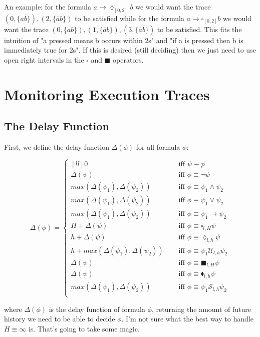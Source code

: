\documentclass[10pt,a4paper]{article}
\newcommand{\ov}[1]{\ensuremath{\overline{#1}}}
\begin{document}
An example: for the formula $a \rightarrow \lozenge_{[0,2]} b$ we would want the trace $(0,\{a\ov{b}\}),(2,\{\ov{a}b\})$ to be satisfied while for the formula $a \rightarrow \square_{[0,2]}b$ we would want the trace $(0,\{ab\}),(1,\{\ov{a}b\}),(3,\{\ov{a}\ov{b}\})$ to be satisfied. This fits the intuition of "a pressed means b occurs within 2s" and "if a is pressed then b is immediately true for 2s". If this is desired (still deciding) then we just need to use open right intervals in the $\square$ and $\blacksquare$ operators.

\section{Monitoring Execution Traces}
\subsection{The Delay Function}
First, we define the delay function $\Delta(\phi)$ for all formula $\phi$:

\[
\Delta(\phi) = \left\lbrace
\begin{aligned}[l l]
0 & \quad \text{ iff } \psi \equiv p \\
\Delta(\psi) & \quad \text{ iff } \phi \equiv \neg \psi \\
max(\Delta(\psi_1),\Delta(\psi_2)) & \quad \text{ iff } \phi \equiv \psi_1 \wedge \psi_2 \\
max(\Delta(\psi_1),\Delta(\psi_2)) & \quad \text{ iff } \phi \equiv \psi_1 \vee \psi_2 \\
max(\Delta(\psi_1),\Delta(\psi_2)) & \quad \text{ iff } \phi \equiv \psi_1 \rightarrow \psi_2 \\
H + \Delta(\psi) & \quad \text{ iff } \phi \equiv \square_{l,H} \psi \\
h + \Delta(\psi) & \quad \text{ iff } \phi \equiv \lozenge_{l,h} \psi \\
h + max(\Delta(\psi_1),\Delta(\psi_2)) & \quad \text{ iff } \phi \equiv \psi_1 \mathcal{U}_{l,h} \psi_2 \\
\Delta(\psi) & \quad \text{ iff } \phi \equiv \blacksquare_{l,H} \psi \\
\Delta(\psi) & \quad \text{ iff } \phi \equiv \blacklozenge_{l,h} \psi \\
max(\Delta(\psi_1),\Delta(\psi_2)) & \quad \text{ iff } \phi \equiv \psi_1 \mathcal{S}_{l,h} \psi_2 \\
\end{aligned} \right. \]

where $\Delta(\phi)$ is the delay function of formula $\phi$, returning the amount of future history we need to be able to decide $\phi$. I'm not sure what the best way to handle $H \equiv \infty$ is. That's going to take some magic.
\end{document}
